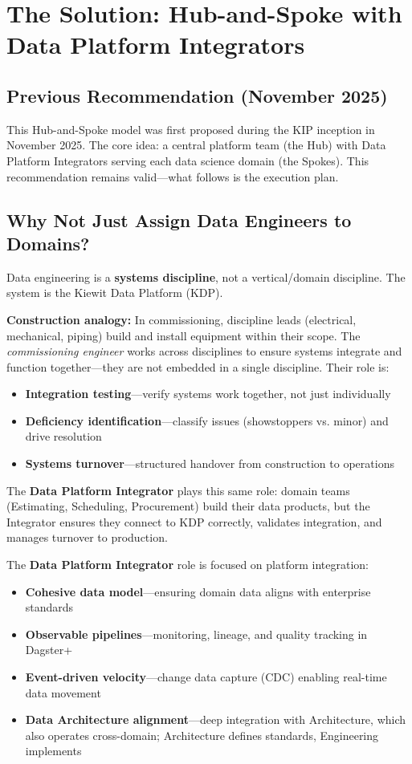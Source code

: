 \documentclass[12pt, a4paper]{article}
\begin{document}
\section{The Solution: Hub-and-Spoke with Data Platform Integrators}

\subsection{Previous Recommendation (November 2025)}
This Hub-and-Spoke model was first proposed during the KIP inception in November 2025. The core idea: a central platform team (the Hub) with Data Platform Integrators serving each data science domain (the Spokes). This recommendation remains valid—what follows is the execution plan.

\subsection{Why Not Just Assign Data Engineers to Domains?}
Data engineering is a \textbf{systems discipline}, not a vertical/domain discipline. The system is the Kiewit Data Platform (KDP). 

\textbf{Construction analogy:} In commissioning, discipline leads (electrical, mechanical, piping) build and install equipment within their scope. The \textit{commissioning engineer} works across disciplines to ensure systems integrate and function together—they are not embedded in a single discipline. Their role is:
\begin{itemize}
    \item \textbf{Integration testing}—verify systems work together, not just individually
    \item \textbf{Deficiency identification}—classify issues (showstoppers vs. minor) and drive resolution
    \item \textbf{Systems turnover}—structured handover from construction to operations
\end{itemize}

\noindent The \textbf{Data Platform Integrator} plays this same role: domain teams (Estimating, Scheduling, Procurement) build their data products, but the Integrator ensures they connect to KDP correctly, validates integration, and manages turnover to production.

\noindent The \textbf{Data Platform Integrator} role is focused on platform integration:
\begin{itemize}
    \item \textbf{Cohesive data model}—ensuring domain data aligns with enterprise standards
    \item \textbf{Observable pipelines}—monitoring, lineage, and quality tracking in Dagster+
    \item \textbf{Event-driven velocity}—change data capture (CDC) enabling real-time data movement
    \item \textbf{Data Architecture alignment}—deep integration with Architecture, which also operates cross-domain; Architecture defines standards, Engineering implements
\end{itemize}
\end{document}

